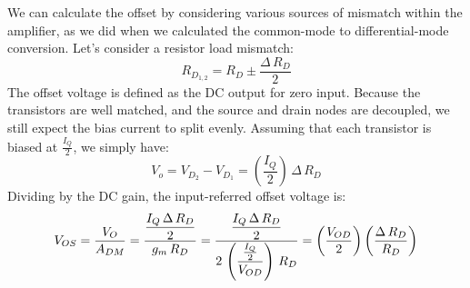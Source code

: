 We can calculate the offset by considering various sources of mismatch within the amplifier, as we did when we calculated the common-mode to differential-mode conversion.  Let's consider a resistor load mismatch:
    \begin{equation} 
        R_{D_{1,2}} = R_D \pm \frac{\Delta\,R_D}{2}
    \end{equation}
The offset voltage is defined as the DC output for zero input.  Because the transistors are well matched, and the source and drain nodes are decoupled, we still expect the bias current to split evenly.  Assuming that each transistor is biased at $\frac{I_Q}{2}$, we simply have:
    \begin{equation}
        V_o = V_{D_2} - V_{D_1} = \left(\frac{I_Q}{2}\right)\,\Delta\,R_D
    \end{equation}
Dividing by the DC gain, the input-referred offset voltage is:
    \begin{equation}
        V_{OS} = \frac{V_O}{A_{DM}}
        = \frac{\mathlarger{\frac{I_Q\,\Delta\,R_D}{2}}}{g_m\,R_D}
        = \frac{\mathlarger{\frac{I_Q\,\Delta\,R_D}{2}}}{2\,\left(\mathlarger{\frac{\frac{I_Q}{2}}{V_{OD}}}\right)\,R_D}
        = \left(\frac{V_{OD}}{2}\right) \left(\frac{\Delta\,R_D}{R_D}\right)
    \end{equation}
\vspace{0.25cm}
